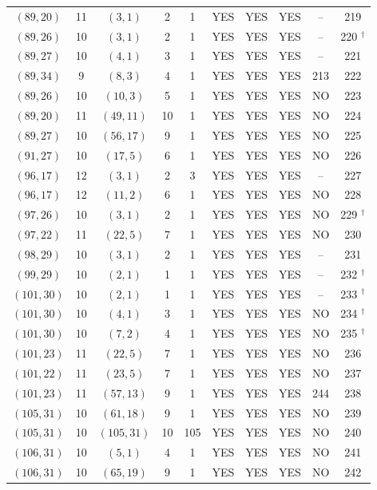 \begin{longtable}{|c|c|c|c|c|c|c|c|c|c|}
$(89, 20)$ & 11 & $(3, 1)$ & 2 & 1 & YES & YES & YES & -- & 219\\
$(89, 26)$ & 10 & $(3, 1)$ & 2 & 1 & YES & YES & YES & -- & 220 ${}^\dagger$\\
$(89, 27)$ & 10 & $(4, 1)$ & 3 & 1 & YES & YES & YES & -- & 221\\
$(89, 34)$ & 9 & $(8, 3)$ & 4 & 1 & YES & YES & YES & 213 & 222\\
$(89, 26)$ & 10 & $(10, 3)$ & 5 & 1 & YES & YES & YES & NO & 223\\
$(89, 20)$ & 11 & $(49, 11)$ & 10 & 1 & YES & YES & YES & NO & 224\\
$(89, 27)$ & 10 & $(56, 17)$ & 9 & 1 & YES & YES & YES & NO & 225\\
$(91, 27)$ & 10 & $(17, 5)$ & 6 & 1 & YES & YES & YES & NO & 226\\
$(96, 17)$ & 12 & $(3, 1)$ & 2 & 3 & YES & YES & YES & -- & 227\\
$(96, 17)$ & 12 & $(11, 2)$ & 6 & 1 & YES & YES & YES & NO & 228\\
$(97, 26)$ & 10 & $(3, 1)$ & 2 & 1 & YES & YES & YES & NO & 229 ${}^\dagger$\\
$(97, 22)$ & 11 & $(22, 5)$ & 7 & 1 & YES & YES & YES & NO & 230\\
$(98, 29)$ & 10 & $(3, 1)$ & 2 & 1 & YES & YES & YES & -- & 231\\
$(99, 29)$ & 10 & $(2, 1)$ & 1 & 1 & YES & YES & YES & -- & 232 ${}^\dagger$\\
$(101, 30)$ & 10 & $(2, 1)$ & 1 & 1 & YES & YES & YES & -- & 233 ${}^\dagger$\\
$(101, 30)$ & 10 & $(4, 1)$ & 3 & 1 & YES & YES & YES & NO & 234 ${}^\dagger$\\
$(101, 30)$ & 10 & $(7, 2)$ & 4 & 1 & YES & YES & YES & NO & 235 ${}^\dagger$\\
$(101, 23)$ & 11 & $(22, 5)$ & 7 & 1 & YES & YES & YES & NO & 236\\
$(101, 22)$ & 11 & $(23, 5)$ & 7 & 1 & YES & YES & YES & NO & 237\\
$(101, 23)$ & 11 & $(57, 13)$ & 9 & 1 & YES & YES & YES & 244 & 238\\
$(105, 31)$ & 10 & $(61, 18)$ & 9 & 1 & YES & YES & YES & NO & 239\\
$(105, 31)$ & 10 & $(105, 31)$ & 10 & 105 & YES & YES & YES & NO & 240\\
$(106, 31)$ & 10 & $(5, 1)$ & 4 & 1 & YES & YES & YES & NO & 241\\
$(106, 31)$ & 10 & $(65, 19)$ & 9 & 1 & YES & YES & YES & NO & 242\\

\end{longtable}
